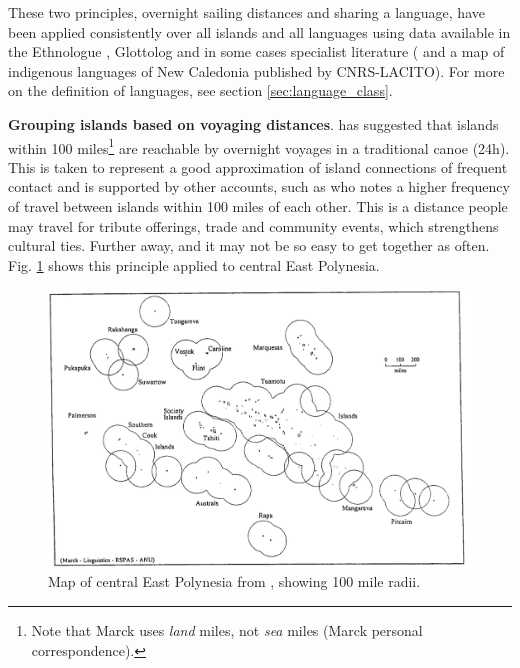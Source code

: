 \documentclass[12pt,letterpaper]{article}
\begin{document}
These two principles, overnight sailing distances and sharing a language, have been applied consistently over all islands and all languages using data available in the Ethnologue \citep{ethnologue22}, Glottolog \citep{glottolog3} and in some cases specialist literature (\citet{faaniu1983tuvalu,charpentier2012linguistic, francoisetatl2015, macdonald_2020, omniglot_tuvaluan} and a map of indigenous languages of New Caledonia published by CNRS-LACITO). For more on the definition of languages, see section \ref{sec:language_class}.




\textbf{Grouping islands based on voyaging distances}. \citet{mark_1986, marck2000} has suggested that islands within 100 miles\footnote{Note that Marck uses \emph{land} miles, not \emph{sea} miles (Marck personal correspondence).} are reachable by overnight voyages in a traditional canoe (24h). This is taken to represent a good approximation of island connections of frequent contact and is supported by other accounts, such as \citep[38]{gladwin2009east} who notes a higher frequency of travel between islands within 100 miles of each other. This is a distance people may travel for tribute offerings, trade and community events, which strengthens cultural ties. Further away, and it may not be so easy to get together as often. Fig. \ref{Marck_2000_east_poly} shows this principle applied to central East Polynesia.

\begin{figure}[ht]
\centering
\includegraphics[width=13cm]{marck_2000_east_poly.png}
\caption{{Map of central East Polynesia from \citet{marck2000}, showing 100 mile radii.}}
\label{Marck_2000_east_poly}
\end{figure}
\end{document}
